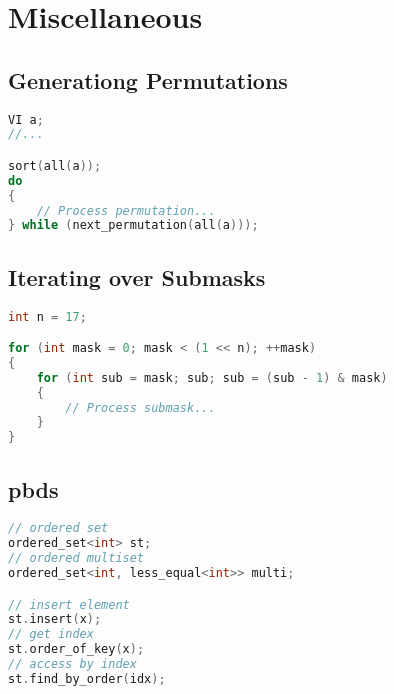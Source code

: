 \chapter{Miscellaneous}

\section{Generationg Permutations}
\begin{lstlisting}[language=C++]
VI a;
//...

sort(all(a));
do
{
    // Process permutation...
} while (next_permutation(all(a)));
\end{lstlisting}
\sectionend

\section{Iterating over Submasks}
\begin{lstlisting}[language=C++]
int n = 17;

for (int mask = 0; mask < (1 << n); ++mask)
{
    for (int sub = mask; sub; sub = (sub - 1) & mask)
    {
        // Process submask...
    }
}
\end{lstlisting}
\sectionend

\section{pbds}
\begin{lstlisting}[language=C++]
// ordered set
ordered_set<int> st;
// ordered multiset
ordered_set<int, less_equal<int>> multi;

// insert element
st.insert(x);
// get index
st.order_of_key(x);
// access by index
st.find_by_order(idx);
\end{lstlisting}
\sectionend